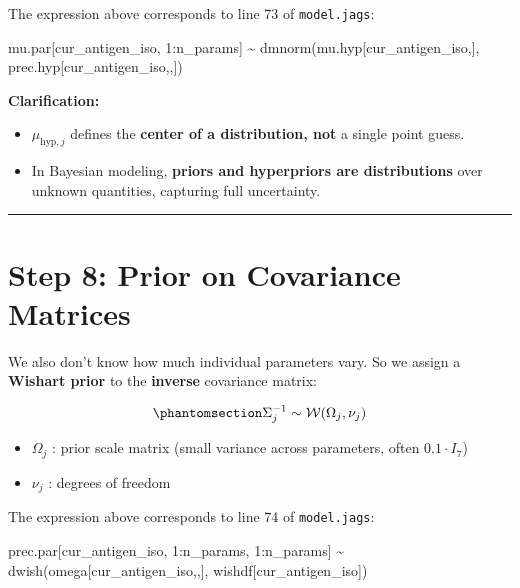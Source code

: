 \documentclass[
]{article}
\newenvironment{Shaded}{\begin{snugshade}}{\end{snugshade}}
\newcommand{\DecValTok}[1]{\textcolor[rgb]{0.68,0.00,0.00}{#1}}
\newcommand{\FunctionTok}[1]{\textcolor[rgb]{0.28,0.35,0.67}{#1}}
\newcommand{\NormalTok}[1]{\textcolor[rgb]{0.00,0.23,0.31}{#1}}
\newcommand{\SpecialCharTok}[1]{\textcolor[rgb]{0.37,0.37,0.37}{#1}}
\providecommand{\tightlist}{%
  \setlength{\itemsep}{0pt}\setlength{\parskip}{0pt}}\usepackage{longtable,booktabs,array}
\begin{document}
The expression above corresponds to line 73 of \texttt{model.jags}:

\begin{Shaded}
\begin{Highlighting}[numbers=left,,firstnumber=73,]
\NormalTok{  mu.par[cur\_antigen\_iso, }\DecValTok{1}\SpecialCharTok{:}\NormalTok{n\_params] }\SpecialCharTok{\textasciitilde{}} \FunctionTok{dmnorm}\NormalTok{(mu.hyp[cur\_antigen\_iso,], prec.hyp[cur\_antigen\_iso,,])}
\end{Highlighting}
\end{Shaded}

\textbf{Clarification:}

\begin{itemize}
\item
  \(\mu_{\text{hyp},j}\) defines the \textbf{center of a distribution,
  not} a single point guess.
\item
  In Bayesian modeling, \textbf{priors and hyperpriors are
  distributions} over unknown quantities, capturing full uncertainty.
\end{itemize}

\begin{center}\rule{0.5\linewidth}{0.5pt}\end{center}

\section{Step 8: Prior on Covariance
Matrices}\label{step-8-prior-on-covariance-matrices}

We also don't know how much individual parameters vary. So we assign a
\textbf{Wishart prior} to the \textbf{inverse} covariance matrix:

\begin{equation}\phantomsection\label{eq-12}{
\Sigma_j^{-1} \sim \mathcal{W}(\Omega_j, \nu_j)
}\end{equation}

\begin{itemize}
\tightlist
\item
  \(\Omega_j\) : prior scale matrix (small variance across parameters,
  often \(0.1 \cdot I_7\))
\item
  \(\nu_j\) : degrees of freedom
\end{itemize}

The expression above corresponds to line 74 of \texttt{model.jags}:

\begin{Shaded}
\begin{Highlighting}[numbers=left,,firstnumber=74,]
\NormalTok{  prec.par[cur\_antigen\_iso, }\DecValTok{1}\SpecialCharTok{:}\NormalTok{n\_params, }\DecValTok{1}\SpecialCharTok{:}\NormalTok{n\_params] }\SpecialCharTok{\textasciitilde{}} \FunctionTok{dwish}\NormalTok{(omega[cur\_antigen\_iso,,], wishdf[cur\_antigen\_iso])}
\end{Highlighting}
\end{Shaded}
\end{document}
